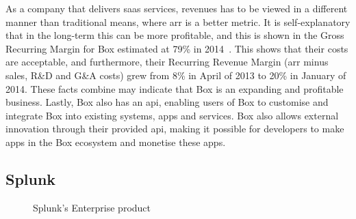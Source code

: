 As a company that delivers \gls{saas} services, revenues has to be viewed in a different manner than traditional means, where \gls{arr} is a better metric. It is self-explanatory that in the long-term this can be more profitable, and this is shown in the Gross Recurring Margin for Box estimated at 79\% in 2014~\cite{tientzuozuora2014}. This shows that their costs are acceptable, and furthermore, their Recurring Revenue Margin (\gls{arr} minus sales, R\&D and G\&A costs) grew from 8\% in April of 2013 to 20\% in January of 2014. These facts combine may indicate that Box is an expanding and profitable business. Lastly, Box also has an \gls{api}, enabling users of Box to customise and integrate Box into existing systems, apps and services. Box also allows external innovation through their provided \gls{api}, making it possible for developers to make apps in the Box ecosystem and monetise these apps. 

\subsection{Splunk}
\begin{figure}[H]
    \centering
    \caption{Splunk's Enterprise product~\cite{splunkinc20162}}
    \label{fig:splunk}
\end{figure}
